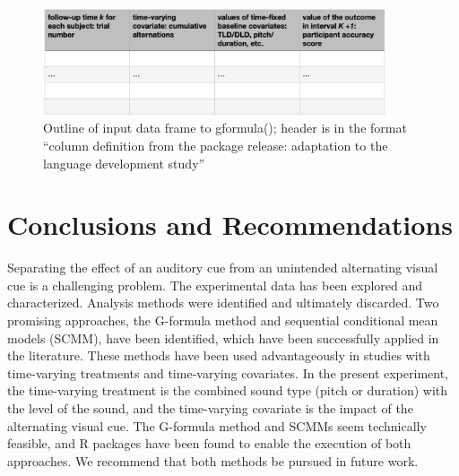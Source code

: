 \documentclass[
  letterpaper,
]{report}
\begin{document}
\begin{figure}

{\centering \includegraphics[width=0.9\textwidth,height=\textheight]{../../visualization/gformula_dataframe.png}

}

\caption{Outline of input data frame to gformula(); header is in the
format ``column definition from the package release: adaptation to the
language development study''}

\end{figure}

\hypertarget{conclusions-and-recommendations}{%
\section{Conclusions and
Recommendations}\label{conclusions-and-recommendations}}

Separating the effect of an auditory cue from an unintended alternating
visual cue is a challenging problem. The experimental data has been
explored and characterized. Analysis methods were identified and
ultimately discarded. Two promising approaches, the G-formula method and
sequential conditional mean models (SCMM), have been identified, which
have been successfully applied in the literature. These methods have
been used advantageously in studies with time-varying treatments and
time-varying covariates. In the present experiment, the time-varying
treatment is the combined sound type (pitch or duration) with the level
of the sound, and the time-varying covariate is the impact of the
alternating visual cue. The G-formula method and SCMMs seem technically
feasible, and R packages have been found to enable the execution of both
approaches. We recommend that both methods be pursued in future work.

\printbibliography[heading=none]
\end{document}

